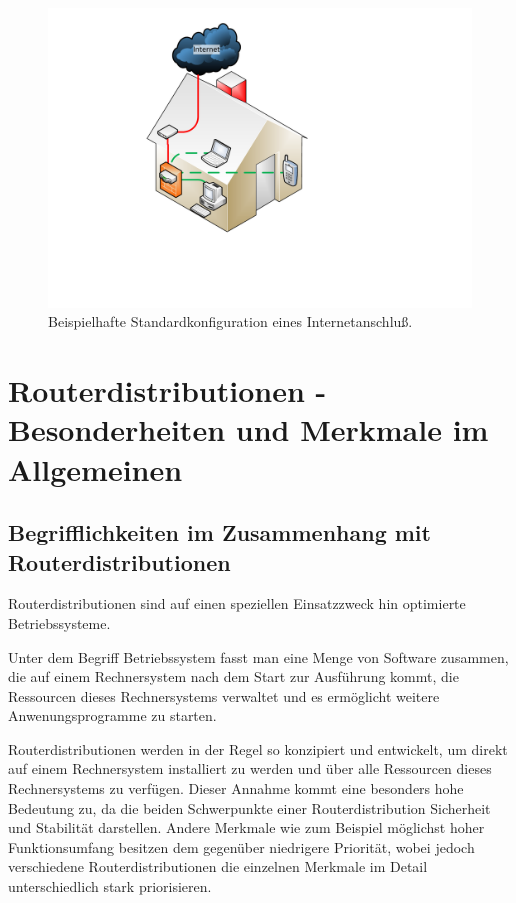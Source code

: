 \documentclass[a4paper,12pt]{scrartcl}
\begin{document}
\begin{figure}[htb]
\begin{center}
 \includegraphics[width=1\hsize]{./images/default.pdf}
\end{center}
\caption[Beispielhafte Standardkonfiguration eines Internetanschlu\ss{}, Quelle: Autor, verwendete Symbole unterliegen der
GPL]{\label{stdinet}Beispielhafte Standardkonfiguration eines Internetanschlu\ss{}.}
\end{figure}

\section{Routerdistributionen - Besonderheiten und Merkmale im Allgemeinen}

\subsection{Begrifflichkeiten im Zusammenhang mit Routerdistributionen}
Routerdistributionen sind auf einen speziellen Einsatzzweck hin optimierte
Betriebssysteme.

Unter dem Begriff Betriebssystem fasst man eine Menge von Software zusammen, die
auf einem Rechnersystem nach dem Start zur Ausführung kommt, die Ressourcen
dieses Rechnersystems verwaltet und es ermöglicht weitere Anwenungsprogramme zu
starten.

Routerdistributionen werden in der Regel so konzipiert und entwickelt,
um direkt auf einem Rechnersystem installiert zu werden und über alle Ressourcen
dieses Rechnersystems zu verfügen. Dieser Annahme kommt eine besonders hohe
Bedeutung zu, da die beiden Schwerpunkte einer Routerdistribution Sicherheit und
Stabilität darstellen. Andere Merkmale wie zum Beispiel m\"oglichst hoher
Funktionsumfang besitzen dem gegen\"uber niedrigere Priorit\"at, wobei jedoch
verschiedene Routerdistributionen die einzelnen Merkmale im
Detail unterschiedlich stark priorisieren.
\end{document}
